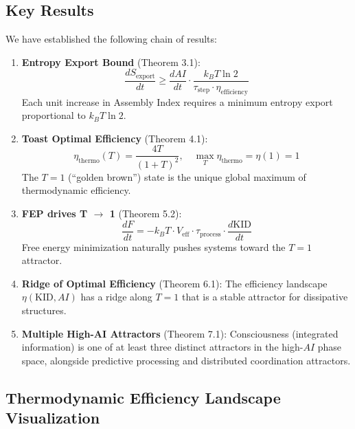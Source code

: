 \documentclass[11pt,a4paper]{article}
\begin{document}
\subsection{Key Results}

We have established the following chain of results:

\begin{enumerate}[label=\textbf{\arabic*.}]
\item \textbf{Entropy Export Bound} (Theorem 3.1):
\begin{equation}
\frac{dS_{\text{export}}}{dt} \geq \frac{dAI}{dt} \cdot \frac{k_B T \ln 2}{\tau_{\text{step}} \cdot \eta_{\text{efficiency}}}
\end{equation}
Each unit increase in Assembly Index requires a minimum entropy export proportional to $k_B T \ln 2$.

\item \textbf{Toast Optimal Efficiency} (Theorem 4.1):
\begin{equation}
\eta_{\text{thermo}}(T) = \frac{4T}{(1+T)^2}, \quad \max_{T} \eta_{\text{thermo}} = \eta(1) = 1
\end{equation}
The $T = 1$ (``golden brown'') state is the unique global maximum of thermodynamic efficiency.

\item \textbf{FEP drives T $\to$ 1} (Theorem 5.2):
\begin{equation}
\frac{dF}{dt} = -k_B T \cdot V_{\text{eff}} \cdot \tau_{\text{process}} \cdot \frac{d\text{KID}}{dt}
\end{equation}
Free energy minimization naturally pushes systems toward the $T = 1$ attractor.

\item \textbf{Ridge of Optimal Efficiency} (Theorem 6.1):
The efficiency landscape $\eta(\text{KID}, AI)$ has a ridge along $T = 1$ that is a stable attractor for dissipative structures.

\item \textbf{Multiple High-AI Attractors} (Theorem 7.1):
Consciousness (integrated information) is one of at least three distinct attractors in the high-$AI$ phase space, alongside predictive processing and distributed coordination attractors.
\end{enumerate}

\subsection{Thermodynamic Efficiency Landscape Visualization}
\end{document}
